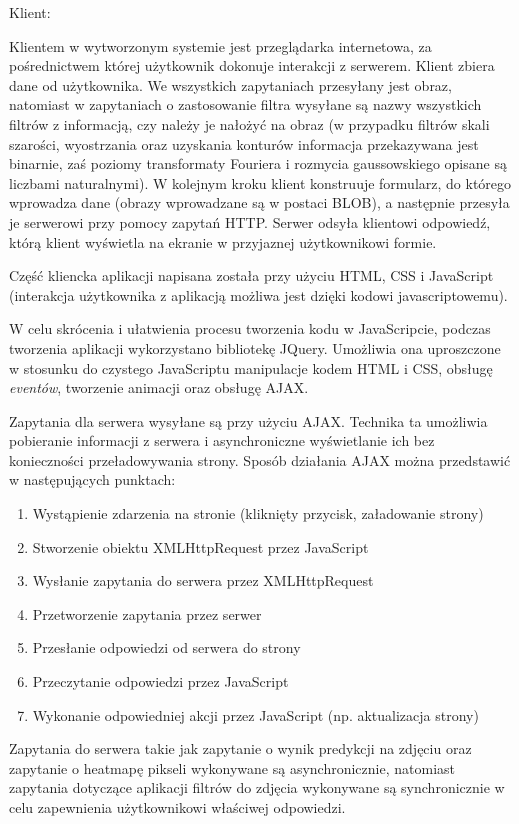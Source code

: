 \documentclass[polish,12pt]{aghthesis}
\begin{document}
\par\noindent Klient:
\par Klientem w wytworzonym systemie jest przeglądarka internetowa, za pośrednictwem której użytkownik dokonuje interakcji z serwerem. Klient zbiera dane od użytkownika. We wszystkich zapytaniach przesyłany jest obraz, natomiast w zapytaniach o zastosowanie filtra wysyłane są nazwy wszystkich filtrów z informacją, czy należy je nałożyć na obraz (w przypadku filtrów skali szarości, wyostrzania oraz uzyskania konturów informacja przekazywana jest binarnie, zaś poziomy transformaty Fouriera i rozmycia gaussowskiego opisane są liczbami naturalnymi). W kolejnym kroku klient konstruuje formularz, do którego wprowadza dane (obrazy wprowadzane są w postaci BLOB), a następnie przesyła je serwerowi przy pomocy zapytań HTTP. Serwer odsyła klientowi odpowiedź, którą klient wyświetla na ekranie w przyjaznej użytkownikowi formie.
\par Część kliencka aplikacji napisana została przy użyciu HTML, CSS i JavaScript (interakcja użytkownika z aplikacją możliwa jest dzięki kodowi javascriptowemu).
\par W celu skrócenia i ułatwienia procesu tworzenia kodu w JavaScripcie, podczas tworzenia aplikacji wykorzystano bibliotekę JQuery. Umożliwia ona uproszczone w stosunku do czystego JavaScriptu manipulacje kodem HTML i CSS, obsługę \textit{eventów}, tworzenie animacji oraz obsługę AJAX.
\par Zapytania dla serwera wysyłane są przy użyciu AJAX. Technika ta umożliwia pobieranie informacji z serwera i asynchroniczne wyświetlanie ich bez konieczności przeładowywania strony. Sposób działania AJAX można przedstawić w następujących punktach\cite{ajax}:
\begin{enumerate}
    \item Wystąpienie zdarzenia na stronie (kliknięty przycisk, załadowanie strony)
    \item Stworzenie obiektu XMLHttpRequest przez JavaScript
    \item Wysłanie zapytania do serwera przez XMLHttpRequest
    \item Przetworzenie zapytania przez serwer
    \item Przesłanie odpowiedzi od serwera do strony
    \item Przeczytanie odpowiedzi przez JavaScript
    \item Wykonanie odpowiedniej akcji przez JavaScript (np. aktualizacja strony)
\end{enumerate}
Zapytania do serwera takie jak zapytanie o wynik predykcji na zdjęciu oraz zapytanie o heatmapę pikseli wykonywane są asynchronicznie, natomiast zapytania dotyczące aplikacji filtrów do zdjęcia wykonywane są synchronicznie w celu zapewnienia użytkownikowi właściwej odpowiedzi.
\end{document}
